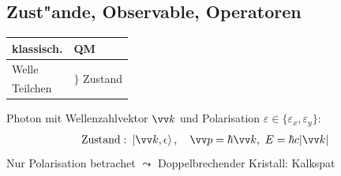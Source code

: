 \documentclass[a4paper]{scrartcl}
\begin{document}
\subsection{Zust"ande, Observable, Operatoren}

{
\begin{center}
\begin{tabular}{l  l}
klassisch. & QM \\
\hline
Welle & \multirow{2}{*}{ $\Big\}$ Zustand } \\
Teilchen
\end{tabular}
\end{center}
Photon mit Wellenzahlvektor $\vv k$ und Polarisation $\varepsilon \in \{ \varepsilon_x, \varepsilon_y \}$:
\begin{align}
\mathrm{Zustand:} \ \Ket{ \vv k, \epsilon}, \quad \vv p = \hbar \vv k, \ E= \hbar c \vert \vv k \vert
\end{align}
Nur Polarisation betrachet $\leadsto$ Doppelbrechender Kristall: Kalkspat

}
\end{document}
